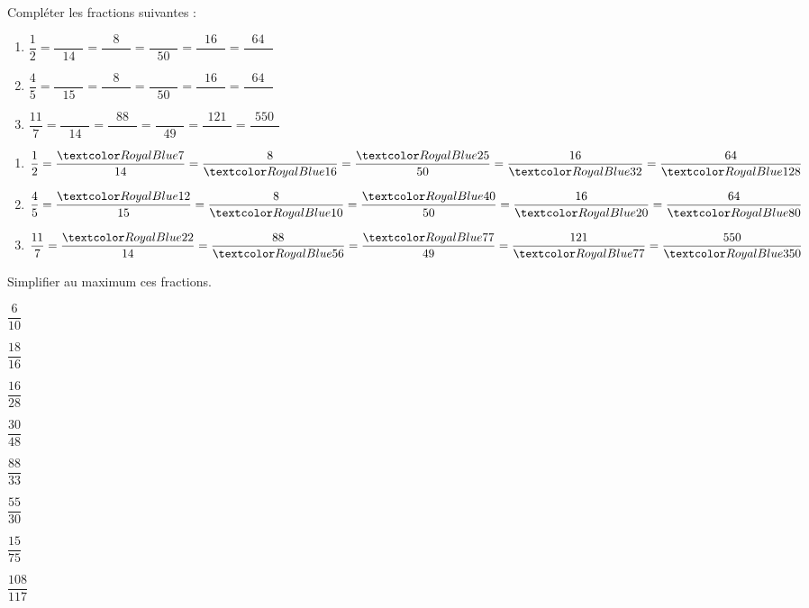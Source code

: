\begin{Maquette}[Fiche,CorrigeFin,Colonnes=2]{}
\begin{multicols}{2}
         
      \begin{exercice}[SLF] %
         Compléter les fractions suivantes : \medskip
         \begin{enumerate}
            \item $\dfrac{1}{2} =\dfrac{\qquad\;}{14} =\dfrac{8}{\qquad\;} =\dfrac{\qquad\;}{50} =\dfrac{16}{\qquad\;} =\dfrac{64}{\qquad\;}$ \\ [2mm]
            \item $\dfrac{4}{5} =\dfrac{\qquad\;}{15} =\dfrac{8}{\qquad\;} =\dfrac{\qquad\;}{50} =\dfrac{16}{\qquad\;} =\dfrac{64}{\qquad\;}$ \\ [2mm]
            \item $\dfrac{11}{7} =\dfrac{\qquad\;}{14} =\dfrac{88}{\qquad\;} =\dfrac{\qquad\;}{49} =\dfrac{121}{\qquad\;} =\dfrac{550}{\qquad\;}$ \\
         \end{enumerate}
      \end{exercice}
      
      \begin{Solution}
         \begin{enumerate}
            \item $\dfrac{1}{2} =\dfrac{\cor{7}}{14} =\dfrac{8}{\cor{16}} =\dfrac{\cor{25}}{50} =\dfrac{16}{\cor{32}} =\dfrac{64}{\cor{128}}$ \par
            \item $\dfrac{4}{5} =\dfrac{\cor{12}}{15} =\dfrac{8}{\cor{10}} =\dfrac{\cor{40}}{50} =\dfrac{16}{\cor{20}} =\dfrac{64}{\cor{80}}$ \par
            \item $\dfrac{11}{7} =\dfrac{\cor{22}}{14} =\dfrac{88}{\cor{56}} =\dfrac{\cor{77}}{49} =\dfrac{121}{\cor{77}} =\dfrac{550}{\cor{350}}$
         \end{enumerate}
      \end{Solution}
         
         
      \begin{exercice} %
         Simplifier au maximum ces fractions. \medskip
         \begin{colenumerate}[4]
            \item $\dfrac{6}{10}$ \bigskip
            \item $\dfrac{18}{16}$ \bigskip
            \item $\dfrac{16}{28}$
            \item $\dfrac{30}{48}$
            \item $\dfrac{88}{33}$
            \item $\dfrac{55}{30}$
            \item $\dfrac{15}{75}$
            \item $\dfrac{108}{117}$
         \end{colenumerate}
      \end{exercice}
      

\end{multicols}
\end{Maquette}
